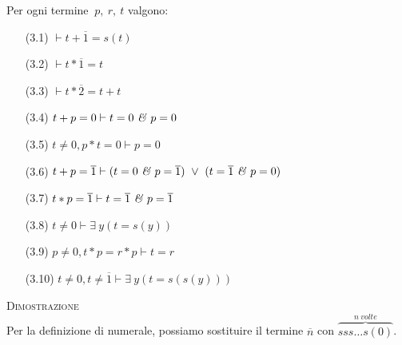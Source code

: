 \begin{prop}
Per ogni termine $\ p,\ r,\ t$ valgono:
\begin{enumerate}
	\item[(3.1)] $\vdash t+\overline{1}=s(t)$
	\vspace{.2cm}
	\item[(3.2)] $\vdash t*\overline{1}=t$
	\vspace{.2cm}
	\item[(3.3)] $\vdash t*\overline{2}=t+t$
	\vspace{.2cm}
	\item[(3.4)] $t+p=0\vdash t=0\ \mbox{\emph{\&}}\ p=0$
	\vspace{.2cm}
	\item[(3.5)] $t\neq 0,p*t=0\vdash p=0$
	\vspace{.2cm}
	\item[(3.6)] $t+p=\overline{1}\vdash (t=0\ \mbox{\emph{\&}}\ p=\overline{1})\ \vee\ (t=\overline{1}\ \mbox{\emph{\&}}\ p=0)$
	\vspace{.2cm}
	\item[(3.7)] $t*p=\overline{1}\vdash t=\overline{1}\ \mbox{\emph{\&}}\ p=\overline{1}$
	\vspace{.2cm}
	\item[(3.8)] $t\neq 0\vdash \exists\ y (t=s(y))$
	\vspace{.2cm}
	\item[(3.9)] $p\neq 0,t*p=r*p\vdash t=r$
	\vspace{.2cm}
	\item[(3.10)] $t\neq 0,t\neq \overline{1}\vdash \exists\ y(t=s(s(y)))$
\end{enumerate}
\end{prop}
\vspace{.5cm}
\textsc{Dimostrazione}\\
 Per la definizione di nume\-rale, possiamo sostituire il termine $\overline{n}$ con ${\overbrace{sss\dots s(0)}^{n\ volte}}$.
